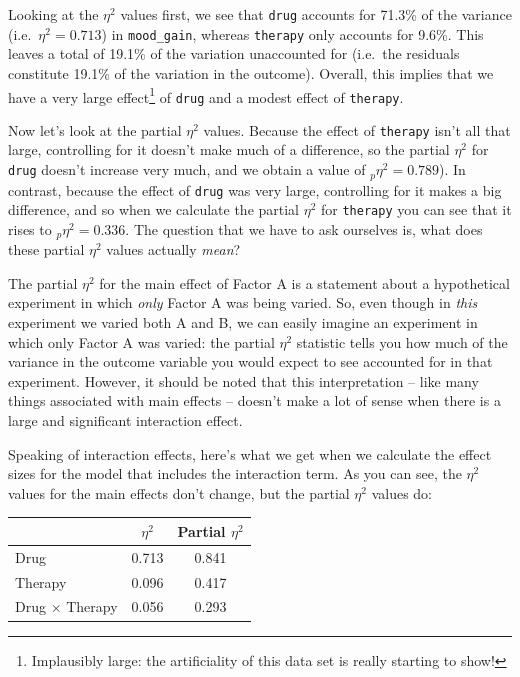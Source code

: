 \documentclass[
  11pt,
  a4paper,
  twoside,symmetric,openright]{book}
\theoremstyle{break}
\theoremstyle{break}
\begin{document}
Looking at the \(\eta^2\) values first, we see that \texttt{drug} accounts for 71.3\% of the variance (i.e.~\(\eta^2 = 0.713\)) in \texttt{mood\_gain}, whereas \texttt{therapy} only accounts for 9.6\%. This leaves a total of 19.1\% of the variation unaccounted for (i.e.~the residuals constitute 19.1\% of the variation in the outcome). Overall, this implies that we have a very large effect\footnote{Implausibly large: the artificiality of this data set is really starting to show!} of \texttt{drug} and a modest effect of \texttt{therapy}.

Now let's look at the partial \(\eta^2\) values. Because the effect of \texttt{therapy} isn't all that large, controlling for it doesn't make much of a difference, so the partial \(\eta^2\) for \texttt{drug} doesn't increase very much, and we obtain a value of \(_p\eta^2 = 0.789\)). In contrast, because the effect of \texttt{drug} was very large, controlling for it makes a big difference, and so when we calculate the partial \(\eta^2\) for \texttt{therapy} you can see that it rises to \(_p\eta^2 = 0.336\). The question that we have to ask ourselves is, what does these partial \(\eta^2\) values actually \emph{mean}?

The partial \(\eta^2\) for the main effect of Factor A is a statement about a hypothetical experiment in which \emph{only} Factor A was being varied. So, even though in \emph{this} experiment we varied both A and B, we can easily imagine an experiment in which only Factor A was varied: the partial \(\eta^2\) statistic tells you how much of the variance in the outcome variable you would expect to see accounted for in that experiment. However, it should be noted that this interpretation -- like many things associated with main effects -- doesn't make a lot of sense when there is a large and significant interaction effect.

Speaking of interaction effects, here's what we get when we calculate the effect sizes for the model that includes the interaction term. As you can see, the \(\eta^2\) values for the main effects don't change, but the partial \(\eta^2\) values do:

\begin{longtable}[]{@{}lcc@{}}
\toprule\noalign{}
& \(\eta^2\) & Partial \(\eta^2\) \\
\midrule\noalign{}
\endhead
\bottomrule\noalign{}
\endlastfoot
Drug & 0.713 & 0.841 \\
Therapy & 0.096 & 0.417 \\
Drug \(\times\) Therapy & 0.056 & 0.293 \\
\end{longtable}
\end{document}
